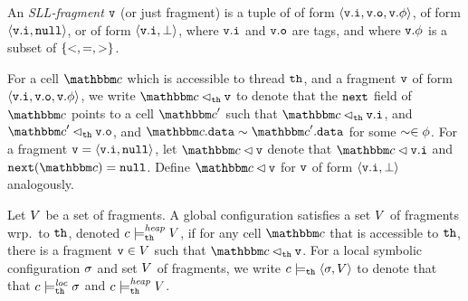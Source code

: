 \begin{definition}
\label{def:sll-fragment}
An {\em SLL-fragment} $\mathtt{v}$ (or just fragment)
is a tuple of of form
$\left\langle\mathtt{v}.\mathtt{i},\mathtt{v}.\mathtt{o},\mathtt{v}.\phi\right\rangle$, of form
$\left\langle\mathtt{v}.\mathtt{i},{\tt null}\right\rangle$, or of form
$\left\langle\mathtt{v}.\mathtt{i},\bot\right\rangle$,
where $\mathtt{v}.\mathtt{i}$ and $\mathtt{v}.\mathtt{o}$ are tags,
    and where $\mathtt{v}.\phi$ is a subset of $\left\{<, =, >\right\}$.
\end{definition}

For a cell $\cell$ which is accessible to thread ${\tt th}$, and a fragment
$\mathtt{v}$ of form $\left\langle\mathtt{v}.\mathtt{i},\mathtt{v}.\mathtt{o},\mathtt{v}.\phi\right\rangle$, we write $\cell \satfrag{\thread}\frag$ to denote that
the ${\tt next}$ field of $\cell$ points to a cell $\cell'$ such that
$\cell \satfrag{\thread} \inat{\frag}$, and
$\cell' \satfrag{\thread} \outat{\frag}$, and
$\cell.\mathtt{data} \sim \cell'.\mathtt{data}$ for some $\sim \in \phi$.
For a fragment $\mathtt{v} = \left\langle\mathtt{v}.\mathtt{i},{\tt null}\right\rangle$, let
$\cell \lhd \frag$ denote that
$\cell \lhd \inat{\frag}$ and $\mathtt{next}(\cell) = \nullconst$.
Define $\cell \lhd \frag$ for $\mathtt{v}$ of form $\left\langle\mathtt{v}.\mathtt{i},\bot\right\rangle$
analogously.

Let $V$ be a set of fragments.
A global configuration satisfies a set $V$ of fragments wrp.\ to ${\tt th}$,
denoted  $c \models_{{\tt th}}^{\mathit{heap}} V$,
if
for any cell $\cell$ that is accessible to ${\tt th}$, there is a fragment
$\mathtt{v} \in V$ such that $\cell \satfrag{{\thread}} \frag$.
For a local symbolic  configuration $\sigma$ and set $V$ of
fragments, we write
$c \models_{{\tt th}} \left\langle\sigma,V\right\rangle$ to denote that
that $c \models_{{\tt th}}^{\mathit{loc}} \sigma$
and $c \models_{{\tt th}}^{\mathit{heap}} V$.


